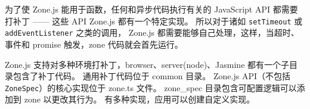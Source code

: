 为了使 Zone.js 能用于函数，任何和异步代码执行有关的 JavaScript API 都需要打补丁
—— 这些 API Zone.js 都有一个特定实现。
所以对于诸如 \texttt{setTimeout} 或 \texttt{addEventListener} 之类的调用，
Zone.js 都需要能够自己处理，这样，当超时、事件和 promise 触发，zone 代码就会首先运行。


Zone.js 支持对多种环境打补丁，browser、server(node)、Jasmine 都有一个子目录包含了补丁代码。
通用补丁代码位于 common 目录。
Zone.js API（不包括 \texttt{ZoneSpec}）的核心实现位于 zone.ts 文件。
zone\_spec 目录包含可配置逻辑可以添加到 zone 以更改其行为。
有多种实现，应用可以创建自定义实现。


